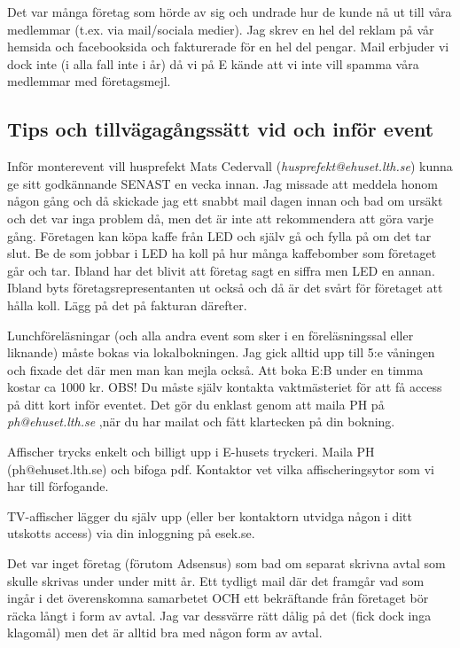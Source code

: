 \documentclass[10pt]{article}
\begin{document}
Det var många företag som hörde av sig och undrade hur de kunde nå ut till våra medlemmar (t.ex.
via mail/sociala medier). Jag skrev en hel del reklam på vår hemsida och facebooksida och
fakturerade för en hel del pengar. Mail erbjuder vi dock inte (i alla fall inte i år) då vi på E kände att vi inte vill spamma våra medlemmar med företagsmejl.

\subsection*{Tips och tillvägagångssätt vid och inför event}

Inför monterevent vill husprefekt Mats Cedervall (\textit{husprefekt@ehuset.lth.se}) kunna ge sitt
godkännande SENAST en vecka innan. Jag missade att meddela honom någon gång och då skickade
jag ett snabbt mail dagen innan och bad om ursäkt och det var inga problem då, men det är inte att
rekommendera att göra varje gång. Företagen kan köpa kaffe från LED och själv gå och fylla på om
det tar slut. Be de som jobbar i LED ha koll på hur många kaffebomber som företaget går och tar. Ibland har det blivit att företag sagt en siffra men LED en annan. Ibland byts företagsrepresentanten ut också och då är det svårt för företaget att hålla koll.
Lägg på det på fakturan därefter.

Lunchföreläsningar (och alla andra event som sker i en föreläsningssal eller liknande) måste bokas via
lokalbokningen. Jag gick alltid upp till 5:e våningen och fixade det där men man kan mejla också. Att boka E:B under en timma kostar ca 1000 kr. OBS! Du måste själv kontakta vaktmästeriet för att få access på ditt kort inför eventet. Det gör du enklast genom att maila PH på \textit{ph@ehuset.lth.se} ,när du har mailat och fått klartecken på din bokning.

Affischer trycks enkelt och billigt upp i E-husets tryckeri. Maila PH (ph@ehuset.lth.se) och bifoga pdf. Kontaktor vet vilka affischeringsytor som vi har till förfogande.

TV-affischer lägger du själv upp (eller ber kontaktorn utvidga någon i ditt utskotts access) via din inloggning på esek.se.

Det var inget företag (förutom Adsensus) som bad om separat skrivna avtal som skulle skrivas under under mitt år. Ett tydligt mail där det framgår vad som ingår i det överenskomna samarbetet OCH ett bekräftande från företaget bör räcka långt i form av avtal. Jag var dessvärre rätt dålig på det (fick dock inga klagomål) men det är alltid bra med någon form av avtal.
\end{document}
